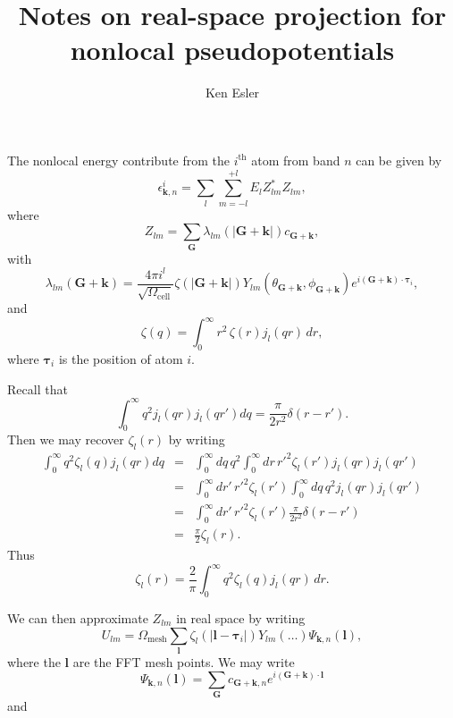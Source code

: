 \documentclass{article}
\title{Notes on real-space projection for nonlocal pseudopotentials}
\author{Ken Esler}
\newcommand{\vG}{\mathbf{G}}
\newcommand{\vk}{\mathbf{k}}
\newcommand{\vl}{\mathbf{l}}
\begin{document}
\maketitle
The nonlocal energy contribute from the $i^\text{th}$ atom from band
$n$ can be given by
\begin{equation}
\epsilon_{\mathbf{k},n}^i = \sum_l \sum_{m=-l}^{+l} E_l Z_{lm}^*
Z_{lm}, 
\end{equation}
where
\begin{equation}
Z_{lm} = \sum_\vG \lambda_{lm}(|\vG + \vk|) c_{\vG + \vk},
\end{equation}
with
\begin{equation}
\lambda_{lm}(\vG + \vk) = \frac{4\pi i^l}{\sqrt{\Omega_\text{cell}}}
\zeta(|\vG + \vk|) Y_{lm}(\theta_{\vG+\vk},\phi_{\vG+\vk}) e^{i(\vG +
  \vk)\cdot \mathbf{\tau}_i},
\end{equation}
and
\begin{equation}
  \zeta(q) = \int_0^\infty r^2\, \zeta(r) j_l(qr) \, dr,
\end{equation}
where $\mathbf{\tau}_i$ is the position of atom $i$.

Recall that 
\begin{equation}
\int_0^\infty q^2 j_l(qr) j_l(qr') dq = \frac{\pi}{2r^2} \delta(r-r').
\end{equation}
Then we may recover $\zeta_l(r)$ by writing
\begin{eqnarray}
\int_0^\infty q^2 \zeta_l(q) j_l(qr) dq & = & \int_0^\infty dq\, q^2
\int_0^\infty dr\, {r'}^2 \zeta_l(r') j_l(qr) j_l(qr') \\
& =  & \int_0^\infty dr'\, {r'}^2 \zeta_l(r') \int_0^\infty dq\, q^2
j_l(qr) j_l(qr')\\ 
& = & \int_0^\infty dr'\, {r'}^2 \zeta_l(r') \frac{\pi}{2r^2}
\delta(r-r') \\
& = & \frac{\pi}{2} \zeta_l(r).
\end{eqnarray}
Thus
\begin{equation}
\zeta_l(r) = \frac{2}{\pi} \int_0^\infty q^2 \zeta_l(q) j_l(qr) \, dr.
\end{equation}

We can then approximate $Z_{lm}$ in real space by writing
\begin{equation}
U_{lm} = \Omega_\text{mesh} \sum_\vl \zeta_l(|\vl - \mathbf{\tau}_i|) 
Y_{lm}(\dots) \Psi_{\vk,n}(\vl),
\end{equation}
where the $\vl$ are the FFT mesh points.  We may write
\begin{equation}
\Psi_{\vk,n}(\vl) = \sum_\vG c_{\vG+\vk,n} e^{i(\vG + \vk)\cdot \vl}
\end{equation}
and
\end{document}
